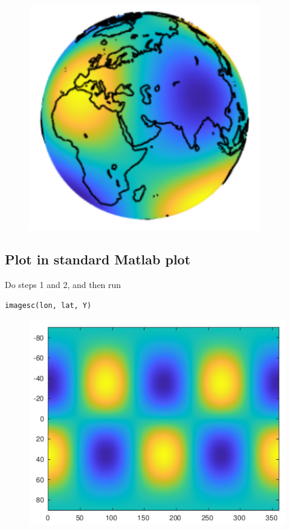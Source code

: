 \documentclass{article}
\begin{document}
\begin{figure}[H]
\includegraphics[scale=1]{graph_on_sphere}
\end{figure}

\subsection{Plot in standard Matlab plot}

Do steps 1 and 2, and then run

\verb+imagesc(lon, lat, Y)+

\begin{figure}[H]
\includegraphics[scale=.75]{standard_matlab_plot}
\end{figure}
\end{document}
